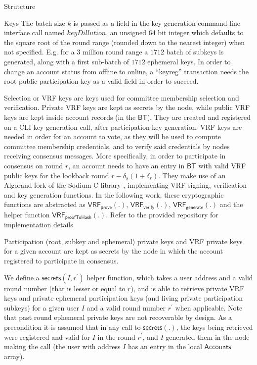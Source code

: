\documentclass[10pt,a4paper]{article}
\begin{document}
\begin{section}{Strutcture}
\begin{subsection}{Keys}
    The batch size $k$ is passed as a field in the key generation command line interface call named 
    $keyDillution$, an unsigned 64 bit integer which defaults to the square root of the round range (rounded down to the nearest integer) 
    when not specified. E.g. for a 3 million round range a $1712$ batch of subkeys is generated,
    along with a first sub-batch of $1712$ ephemeral keys.
    In order to change an account status from offline to online, a ``keyreg'' transaction needs the 
    root public participation key as a valid field in order to succeed.


    Selection or VRF keys are keys used for committee membership selection and verification.
    Private VRF keys are kept as secrets by the node, while public VRF keys are kept inside 
    account records (in the $\mathsf{BT}$).
    They are created and registered on a CLI key generation call, after participation key generation.
    VRF keys are needed in order for an account to vote, as they will be
    used to compute committee membership credentials, and to verify said credentials by nodes receiving consensus messages.
    More specifically, in order to participate in consensus on round $r$, an account needs to have an entry in $\mathsf{BT}$
    with valid VRF public keys for the lookback round $r-\delta_s(1+\delta_r)$.
    They make use of an Algorand fork of the Sodium C library , implementing VRF signing, verification and
    key generation functions.
    In the following work, these cryptographic functions are abstracted as $\mathsf{VRF_{prove}}(.)$, $\mathsf{VRF_{verify}}(.)$, $\mathsf{VRF_{generate}}(.)$
    and the helper function $\mathsf{VRF_{proofToHash}}(.)$.
    Refer to the provided repository for implementation details.

    Participation (root, subkey and ephemeral) private keys and VRF private keys for a given account are kept as secrets by the node
    in which the account registered to participate in consensus.


    We define a $\mathsf{secrets}(I, r^\prime)$ helper function, which takes a user address and
    a valid round number (that is lesser or equal to $r$), and is able to retrieve private VRF keys
    and private ephemeral participation keys (and living private participation subkeys) for a given user $I$ 
    and a valid round number $r^\prime$ when applicable. Note that past round ephemeral private keys are not recoverable
    by design. 
    As a precondition it is assumed that in any call to $\mathsf{secrets(.)}$,
    the keys being retrieved were registered and valid for $I$ in the round $r^\prime$, and $I$ generated them
    in the node making the call (the user with address $I$ has an entry in the local $\mathsf{Accounts}$ array).


\end{subsection}
\end{section}
\end{document}
